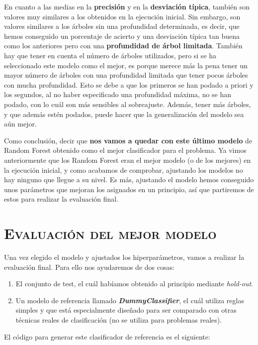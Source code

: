 \documentclass[11pt,a4paper]{article}
\begin{document}
En cuanto a las medias en la \textbf{precisión} y en la \textbf{desviación típica}, también son valores muy similares a los obtenidos en la ejecución
inicial. Sin embargo, son valores similares a los árboles sin una profundidad determinada, es decir, que hemos conseguido un porcentaje de
acierto y una desviación típica tan buena como los anteriores pero con una \textbf{profundidad de árbol limitada}. También hay que tener en cuenta
el número de árboles utilizados, pero si se ha seleccionado este modelo como el mejor, es porque merece más la pena tener un mayor número
de árboles con una profundidad limitada que tener pocos árboles con mucha profundidad. Esto se debe a que los primeros se han podado a
priori y los segundos, al no haber especificado una profundidad máxima, no se han podado, con lo cuál son más sensibles al sobreajuste.
Además, tener más árboles, y que además estén podados, puede hacer que la generalización del modelo sea aún mejor.

Como conclusión, decir que \textbf{nos vamos a quedar con este último modelo} de Random Forest obtenido como el mejor clasificador para el problema.
Ya vimos anteriormente que los Random Forest eran el mejor modelo (o de los mejores) en la ejecución inicial, y como acabamos de comprobar,
ajustando los modelos no hay ninguno que llegue a su nivel. Es más, ajustando el modelo hemos conseguido unos parámetros que mejoran los
asignados en un principio, así que partiremos de estos para realizar la evaluación final.

\section{\textsc{Evaluación del mejor modelo}}

Una vez elegido el modelo y ajustados los hiperparámetros, vamos a realizar la evaluación final. Para ello nos ayudaremos de dos cosas: 
\begin{enumerate}
    \item El conjunto de test, el cuál habíamos obtenido al principio mediante \textit{hold-out}.
    \item Un modelo de referencia llamado \textbf{\textit{DummyClassifier}}\cite{DummyClassifier}, el cuál utiliza reglas simples y que está
    especialmente diseñado para ser comparado con otras técnicas reales de clasificación (no se utiliza para problemas reales).
\end{enumerate}

El código para generar este clasificador de referencia es el siguiente:
\end{document}
